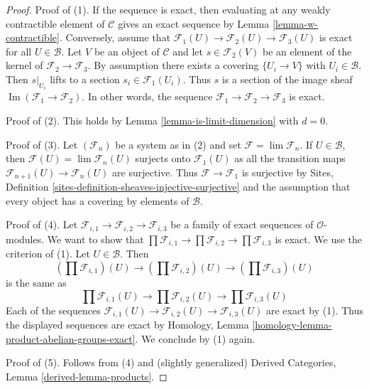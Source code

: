 \documentclass[10pt,a4paper]{amsart}
\theoremstyle{plain}
\theoremstyle{definition}
\theoremstyle{remark}
\numberwithin{equation}{subsection}
\def\lim{\mathop{\mathrm{lim}}\nolimits}
\def\Im{\mathop{\mathrm{Im}}}
\begin{document}
\begin{proof}
Proof of (1). If the sequence is exact, then evaluating at any
weakly contractible element of $\mathcal{C}$ gives an exact
sequence by Lemma \ref{lemma-w-contractible}. Conversely, assume that
$\mathcal{F}_1(U) \to \mathcal{F}_2(U) \to \mathcal{F}_3(U)$
is exact for all $U \in \mathcal{B}$.
Let $V$ be an object of $\mathcal{C}$ and let
$s \in \mathcal{F}_2(V)$ be an element of the kernel of
$\mathcal{F}_2 \to \mathcal{F}_3$. By assumption there exists
a covering $\{U_i \to V\}$ with $U_i \in \mathcal{B}$.
Then $s|_{U_i}$ lifts to a section $s_i \in \mathcal{F}_1(U_i)$.
Thus $s$ is a section of the image sheaf
$\Im(\mathcal{F}_1 \to \mathcal{F}_2)$.
In other words, the sequence
$\mathcal{F}_1 \to \mathcal{F}_2 \to \mathcal{F}_3$
is exact.

\medskip\noindent
Proof of (2). This holds by Lemma \ref{lemma-is-limit-dimension} with $d = 0$.

\medskip\noindent
Proof of (3). Let $(\mathcal{F}_n)$ be a system as in (2) and set
$\mathcal{F} = \lim \mathcal{F}_n$. If $U \in \mathcal{B}$, then
$\mathcal{F}(U) = \lim \mathcal{F}_n(U)$
surjects onto $\mathcal{F}_1(U)$ as all the transition maps
$\mathcal{F}_{n + 1}(U) \to \mathcal{F}_n(U)$ are surjective.
Thus $\mathcal{F} \to \mathcal{F}_1$ is surjective by
Sites, Definition \ref{sites-definition-sheaves-injective-surjective}
and the assumption that every object
has a covering by elements of $\mathcal{B}$.

\medskip\noindent
Proof of (4). Let
$\mathcal{F}_{i, 1} \to \mathcal{F}_{i, 2} \to \mathcal{F}_{i, 3}$
be a family of exact sequences of $\mathcal{O}$-modules.
We want to show that
$\prod \mathcal{F}_{i, 1} \to \prod \mathcal{F}_{i, 2} \to
\prod \mathcal{F}_{i, 3}$ is exact. We use the criterion of (1).
Let $U \in \mathcal{B}$. Then
$$
(\prod \mathcal{F}_{i, 1})(U) \to
(\prod \mathcal{F}_{i, 2})(U) \to
(\prod \mathcal{F}_{i, 3})(U)
$$
is the same as
$$
\prod \mathcal{F}_{i, 1}(U) \to
\prod \mathcal{F}_{i, 2}(U) \to
\prod \mathcal{F}_{i, 3}(U)
$$
Each of the sequences
$\mathcal{F}_{i, 1}(U) \to \mathcal{F}_{i, 2}(U) \to \mathcal{F}_{i, 3}(U)$
are exact by (1). Thus the displayed sequences are exact by
Homology, Lemma \ref{homology-lemma-product-abelian-groups-exact}.
We conclude by (1) again.

\medskip\noindent
Proof of (5). Follows from (4) and (slightly generalized)
Derived Categories, Lemma \ref{derived-lemma-products}.


\end{proof}
\end{document}
